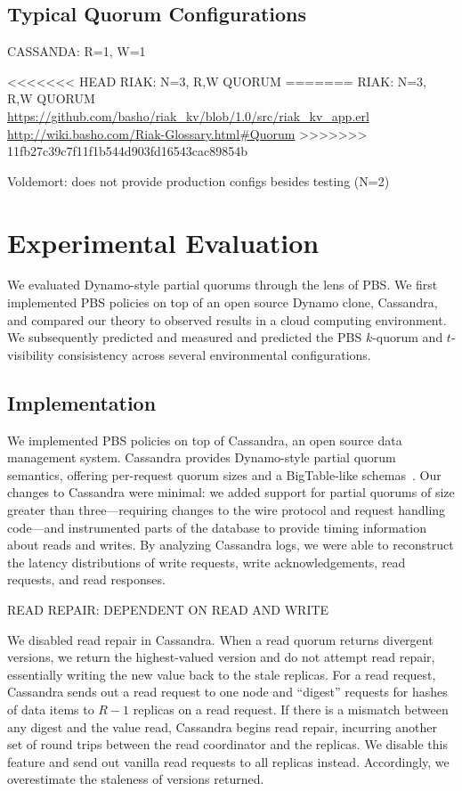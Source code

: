 \documentclass{vldb}
\begin{document}
\subsection{Typical Quorum Configurations}

CASSANDA: R=1, W=1 

<<<<<<< HEAD
RIAK: N=3, R,W QUORUM 
=======
RIAK: N=3, R,W QUORUM \url{https://github.com/basho/riak_kv/blob/1.0/src/riak_kv_app.erl}
\url{http://wiki.basho.com/Riak-Glossary.html#Quorum}
>>>>>>> 11fb27c39c7f11f1b544d903fd16543cac89854b

Voldemort: does not provide production configs besides testing (N=2)

\section{Experimental Evaluation}
\label{sec:eval}

We evaluated Dynamo-style partial quorums through the lens of PBS.  We
first implemented PBS policies on top of an open source Dynamo clone,
Cassandra, and compared our theory to observed results in a cloud
computing environment.  We subsequently predicted and measured and
predicted the PBS $k$-quorum and $t$-visibility consisistency across
several environmental configurations.

\subsection{Implementation}

We implemented PBS policies on top of Cassandra, an open source data
management system.  Cassandra provides Dynamo-style partial quorum
semantics, offering per-request quorum sizes and a BigTable-like
schemas~\cite{needed}.  Our changes to Cassandra were minimal: we
added support for partial quorums of size greater than
three---requiring changes to the wire protocol and request handling
code---and instrumented parts of the database to provide timing
information about reads and writes.  By analyzing Cassandra logs, we
were able to reconstruct the latency distributions of write requests,
write acknowledgements, read requests, and read responses.

READ REPAIR: DEPENDENT ON READ AND WRITE

We disabled read repair in Cassandra.  When a read quorum returns
divergent versions, we return the highest-valued version and do not
attempt read repair, essentially writing the new value back to the
stale replicas.  For a read request, Cassandra sends out a read
request to one node and ``digest'' requests for hashes of data items
to $R-1$ replicas on a read request.  If there is a mismatch between
any digest and the value read, Cassandra begins read repair, incurring
another set of round trips between the read coordinator and the
replicas.  We disable this feature and send out vanilla read requests
to all replicas instead.  Accordingly, we overestimate the staleness
of versions returned.
\end{document}
